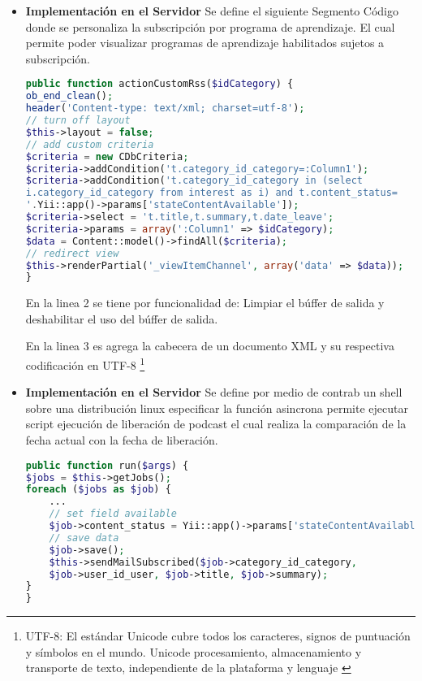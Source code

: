 \begin{itemize}

\item \textbf{Implementaci\'{o}n en el Servidor} Se define el siguiente Segmento
C\'{o}digo donde se personaliza la subscripci\'{o}n por programa de aprendizaje.
El cual permite poder visualizar programas de aprendizaje habilitados sujetos a
subscripci\'{o}n.

\begin{lstlisting}[language = PHP]
public function actionCustomRss($idCategory) {
ob_end_clean();
header('Content-type: text/xml; charset=utf-8');
// turn off layout
$this->layout = false;
// add custom criteria
$criteria = new CDbCriteria;
$criteria->addCondition('t.category_id_category=:Column1');
$criteria->addCondition('t.category_id_category in (select 
i.category_id_category from interest as i) and t.content_status=
'.Yii::app()->params['stateContentAvailable']);
$criteria->select = 't.title,t.summary,t.date_leave';
$criteria->params = array(':Column1' => $idCategory);
$data = Content::model()->findAll($criteria);
// redirect view
$this->renderPartial('_viewItemChannel', array('data' => $data));
}
\end{lstlisting}

En la linea 2 se tiene por funcionalidad de: Limpiar el b\'{u}ffer de
salida y deshabilitar el uso del b\'{u}ffer de salida.

En la linea 3 es agrega la cabecera de un documento XML y su respectiva
codificaci\'{o}n en UTF-8 \footnote{UTF-8: El est\'{a}ndar Unicode cubre todos
los caracteres, signos de puntuaci\'{o}n y s\'{i}mbolos en el mundo. Unicode 
procesamiento, almacenamiento y transporte de texto, independiente de la 
plataforma y lenguaje \cite{utf8}}

\item \textbf{Implementaci\'{o}n en el Servidor} Se define por medio de contrab
un shell sobre una distribuci\'{o}n linux especificar la funci\'{o}n asincrona
permite ejecutar script ejecuci\'{o}n de liberaci\'{o}n de podcast el cual 
realiza la comparaci\'{o}n de la fecha actual con la fecha de liberaci\'{o}n.

\begin{lstlisting}[language = PHP]
public function run($args) {	
$jobs = $this->getJobs();
foreach ($jobs as $job) {
	...
    // set field available
    $job->content_status = Yii::app()->params['stateContentAvailable'];
    // save data
    $job->save();
    $this->sendMailSubscribed($job->category_id_category, 
    $job->user_id_user, $job->title, $job->summary);
}
}
\end{lstlisting}

\end{itemize}

